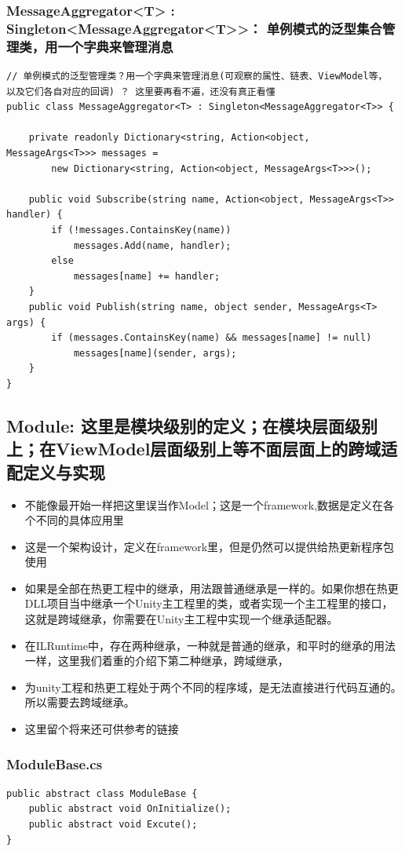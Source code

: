 \documentclass[9pt, b5paper]{article}
\begin{document}
\subsubsection{MessageAggregator<T> : Singleton<MessageAggregator<T>>： 单例模式的泛型集合管理类，用一个字典来管理消息}
\label{sec-6-2-2}
\begin{verbatim}
// 单例模式的泛型管理类？用一个字典来管理消息(可观察的属性、链表、ViewModel等， 以及它们各自对应的回调) ？ 这里要再看不遍，还没有真正看懂
public class MessageAggregator<T> : Singleton<MessageAggregator<T>> {

    private readonly Dictionary<string, Action<object, MessageArgs<T>>> messages =
        new Dictionary<string, Action<object, MessageArgs<T>>>();

    public void Subscribe(string name, Action<object, MessageArgs<T>> handler) {
        if (!messages.ContainsKey(name)) 
            messages.Add(name, handler);
        else 
            messages[name] += handler;
    }
    public void Publish(string name, object sender, MessageArgs<T> args) {
        if (messages.ContainsKey(name) && messages[name] != null) 
            messages[name](sender, args);
    }
}
\end{verbatim}
\subsection{Module: 这里是模块级别的定义；在模块层面级别上；在ViewModel层面级别上等不面层面上的跨域适配定义与实现}
\label{sec-6-3}
\begin{itemize}
\item 不能像最开始一样把这里误当作Model；这是一个framework,数据是定义在各个不同的具体应用里
\item 这是一个架构设计，定义在framework里，但是仍然可以提供给热更新程序包使用
\item 如果是全部在热更工程中的继承，用法跟普通继承是一样的。如果你想在热更DLL项目当中继承一个Unity主工程里的类，或者实现一个主工程里的接口，这就是跨域继承，你需要在Unity主工程中实现一个继承适配器。
\item 在ILRuntime中，存在两种继承，一种就是普通的继承，和平时的继承的用法一样，这里我们着重的介绍下第二种继承，跨域继承，
\item 为unity工程和热更工程处于两个不同的程序域，是无法直接进行代码互通的。所以需要去跨域继承。
\item 这里留个将来还可供参考的链接
\end{itemize}
\subsubsection{ModuleBase.cs}
\label{sec-6-3-1}
\begin{verbatim}
public abstract class ModuleBase {
    public abstract void OnInitialize();
    public abstract void Excute();
}
\end{verbatim}
\end{document}
